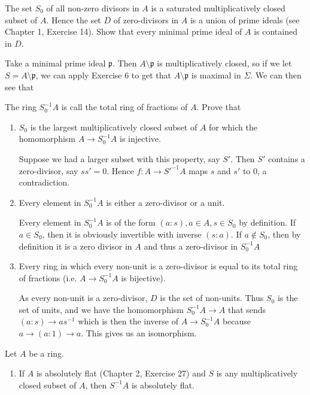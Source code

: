 \documentclass[a4paper]{exam}
\newif\ifhint
\begin{document}
\begin{questions}
\question The set $S_{0} $ of all non-zero divisors in $A $ is a saturated multiplicatively closed subset of $A $. Hence the set $D $ of zero-divisors in $A $ is a union of prime ideals (see Chapter 1, Exercise 14). Show that every minimal prime ideal of $A $ is contained in $D $.
\ifhint
	Use Exercise 6
\fi
\begin{solution}
	Take a minimal prime ideal $\mathfrak{p} $.
	Then $A \setminus \mathfrak{p} $ is multiplicatively closed, so if we let $S = A \setminus \mathfrak{p} $, we can apply Exercise 6 to get that $A\setminus \mathfrak{p} $ is maximal in $\Sigma $.
	We can then see that 
\end{solution}
The ring $S_{0}^{-1}A $ is call the total ring of fractions of $A $. Prove that
\begin{enumerate}
\item $S_{0} $ is the largest multiplicatively closed subset of $A $ for which the homomorphism $A\to S_{0}^{-1}A $ is injective.
	\begin{solution}
		Suppose we had a larger subset with this property, say $S' $.
		Then $S' $ contains a zero-divisor, say $ss' = 0 $.
		Hence $f:A\to S'^{-1}A $ maps $s $ and $s' $ to $0 $, a contradiction.
	\end{solution}
\item Every element in $S_{0}^{-1}A $ is either a zero-divisor or a unit.
	\begin{solution}
		Every element in $S_{0}^{-1}A $ is of the form $(a:s), a\in A, s\in S_{0}$ by definition.
		If $a\in S_{0} $, then it is obviously invertible with inverse $(s:a) $.
		If $a\not\in S_{0} $, then by definition it is a zero divisor in $A $ and thus a zero-divisor in $S_{0}^{-1}A $
	\end{solution}
\item Every ring in which every non-unit is a zero-divisor is equal to its total ring of fractions (i.e. $A\to S_{0}^{-1}A $ is bijective).
	\begin{solution}
		As every non-unit is a zero-divisor, $D $ is the set of non-units.
		Thus $S_{0} $ is the set of units, and we have the homomorphism $S_{0}^{-1}A \to A $ that sends $(a:s) \to as^{-1} $ which is then the inverse of $A\to S_{0}^{-1}A $ because $a \to (a:1) \to a $.
		This gives us an isomorphism.
	\end{solution}
\end{enumerate}
\question Let $A $ be a ring.
\begin{enumerate}
	\item If $A $ is absolutely flat (Chapter 2, Exercise 27) and $S $ is any multiplicatively closed subset of $A $, then $S^{-1}A $ is absolutely flat.

\end{enumerate}
\end{questions}
\end{document}
